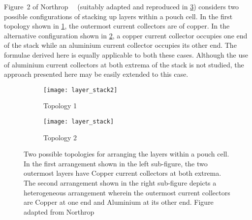 Figure~2 of Northrop~\etal~\cite{Northrop2011}  (suitably adapted and reproduced
in \cref{fig:topologies})  considers two possible configurations  of stacking up
layers within a pouch cell. In the first topology shown in \cref{fig:topology1},
the outermost current collectors are of copper. In the alternative configuration
shown in  \cref{fig:topology2}, a copper  current collector occupies one  end of
the  stack while  an aluminium  current collector  occupies its  other end.  The
formulae derived  here is equally applicable  to both these cases.  Although the
use of aluminium current collectors at both extrema of the stack is not studied,
the approach presented here may be easily extended to this case.

\begin{figure}[!htbp]
    \centering
    \begin{subfigure}[b]{0.725\textwidth}
        \texttt{[image: layer\_stack2]}
        \caption{Topology 1}
        \label{fig:topology1}
    \end{subfigure}
    \hfill
    \begin{subfigure}[b]{0.225\textwidth}
        \texttt{[image: layer\_stack]}
        \caption{Topology 2}
        \label{fig:topology2}
    \end{subfigure}
    \caption[Two possile topologies for arranging the layers within a pouch
    cell]
    {Two possible topologies for arranging the layers within a pouch cell. In
        the first arrangement shown in the left sub-figure, the two outermost
        layers have Copper current collectors at both extrema. The second arrangement shown in the
        right sub-figure depicts a heterogeneous arrangement wherein the
        outermost current collectors are Copper at one end and Aluminium
        at its other end. Figure adapted from
    Northrop~\etal~\cite{Northrop2011}}
    \label{fig:topologies}
\end{figure}

